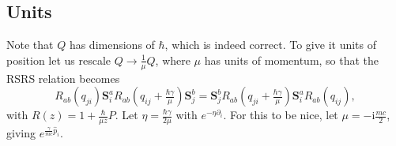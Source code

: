 \documentclass[11pt]{report}
\theoremstyle{definition}
\theoremstyle{remark}
\theoremstyle{remark}
\newcommand{\I}{\mathrm{i}}
\begin{document}
\subsection{Units}

Note that $Q$ has dimensions of $\hbar$, which is indeed correct. To give it units of position let us rescale $Q \to \frac{1}{\mu} Q$, where $\mu$ has units of momentum, so that the RSRS relation becomes
\begin{equation*}
R_{ab}(q_{ji}) \mathbf{S}_i^a R_{ab}(q_{ij}+\tfrac{\hbar\gamma}{\mu}) \mathbf{S}_j^b = \mathbf{S}_j^b R_{ab}(q_{ji}+\tfrac{\hbar\gamma} {\mu}) \mathbf{S}_i^a R_{ab}(q_{ij}),
\end{equation*}
with $R(z) = 1+\frac{\hbar}{\mu z} P$. Let $\eta = \frac{\hbar\gamma}{2\mu}$ with $e^{-\eta\partial_i}$. For this to be nice, let $\mu = -\I \frac{mc}{2}$, giving $e^{\frac{\gamma}{mc} \hat p_i}$.
\end{document}
